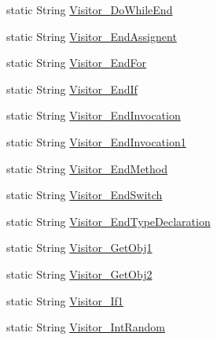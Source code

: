 \begin{DoxyCompactItemize}
static String \hyperlink{classit_1_1isislab_1_1masonhelperdocumentation_1_1visitor_1_1_messages_a51a130626b490a71efd339a23c0e4ddf}{Visitor\-\_\-\-Do\-While\-End}
\item 
static String \hyperlink{classit_1_1isislab_1_1masonhelperdocumentation_1_1visitor_1_1_messages_ad3b39e81af7e7f2d36f3b9522b0d7ea5}{Visitor\-\_\-\-End\-Assignent}
\item 
static String \hyperlink{classit_1_1isislab_1_1masonhelperdocumentation_1_1visitor_1_1_messages_a22bdeb4184a47b5dca73a5f6be80829f}{Visitor\-\_\-\-End\-For}
\item 
static String \hyperlink{classit_1_1isislab_1_1masonhelperdocumentation_1_1visitor_1_1_messages_ac30d6eb5c0dfe157ff4707375c9bc967}{Visitor\-\_\-\-End\-If}
\item 
static String \hyperlink{classit_1_1isislab_1_1masonhelperdocumentation_1_1visitor_1_1_messages_a7ab9657bd735f535914e6dac47dc695f}{Visitor\-\_\-\-End\-Invocation}
\item 
static String \hyperlink{classit_1_1isislab_1_1masonhelperdocumentation_1_1visitor_1_1_messages_a6957d9ba08f400484b9486ec63525905}{Visitor\-\_\-\-End\-Invocation1}
\item 
static String \hyperlink{classit_1_1isislab_1_1masonhelperdocumentation_1_1visitor_1_1_messages_aecf94c4bd9def64267445d4624298066}{Visitor\-\_\-\-End\-Method}
\item 
static String \hyperlink{classit_1_1isislab_1_1masonhelperdocumentation_1_1visitor_1_1_messages_ad36ac06cbc96b50d396a7400b4faf972}{Visitor\-\_\-\-End\-Switch}
\item 
static String \hyperlink{classit_1_1isislab_1_1masonhelperdocumentation_1_1visitor_1_1_messages_aea00da7022007d6739ca682635b64092}{Visitor\-\_\-\-End\-Type\-Declaration}
\item 
static String \hyperlink{classit_1_1isislab_1_1masonhelperdocumentation_1_1visitor_1_1_messages_a00fd03d55ee1e4a849eaf0c12889d13c}{Visitor\-\_\-\-Get\-Obj1}
\item 
static String \hyperlink{classit_1_1isislab_1_1masonhelperdocumentation_1_1visitor_1_1_messages_adb4d4dfb69d0b431e27ab809f5297072}{Visitor\-\_\-\-Get\-Obj2}
\item 
static String \hyperlink{classit_1_1isislab_1_1masonhelperdocumentation_1_1visitor_1_1_messages_ac6f01afa599112e0c7d73c67a0e68d1a}{Visitor\-\_\-\-If1}
\item 
static String \hyperlink{classit_1_1isislab_1_1masonhelperdocumentation_1_1visitor_1_1_messages_a63562b8d5406e5c9a564ba8c0d7dfae2}{Visitor\-\_\-\-Int\-Random}

\end{DoxyCompactItemize}
